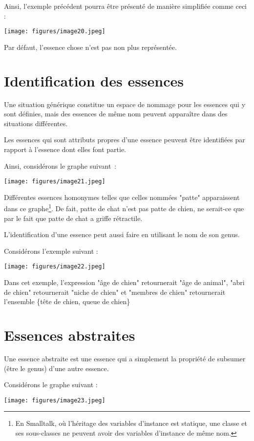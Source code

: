 \documentclass[a4paper, 12pt, openright, french]{book}
\begin{document}
Ainsi, l'exemple précédent pourra être présenté de
manière simplifiée comme ceci :

\texttt{[image: figures/image20.jpeg]}

Par défaut, l'essence chose n'est pas
non plus représentée.

\newpage
\raggedbottom
\section{Identification des essences}

Une situation générique constitue un espace de nommage pour les essences
qui y sont définies, mais des essences de même nom peuvent apparaître dans des situations
différentes.

Les essences qui sont attributs propres d'une essence
peuvent être identifiées par rapport à l'essence dont
elles font partie.

Ainsi, considérons le graphe suivant~:

\texttt{[image: figures/image21.jpeg]}

Différentes essences homonymes telles que celles nommées "patte"
apparaissent dans ce graphe\footnote{En Smalltalk, où l'héritage des variables d'instance est statique, une classe et ses sous-classes ne peuvent avoir des variables d'instance de même nom.}. De fait, patte de chat n'est pas patte de chien, ne serait-ce que par le fait que patte de chat a griffe rétractile.

L'identification d'une essence peut
aussi faire en utilisant le nom de son genus.

Considérons l'exemple suivant :

\texttt{[image: figures/image22.jpeg]}

Dans cet exemple, l'expression "âge de chien"
retournerait "âge de animal", "abri de chien" retournerait "niche de
chien" et "membres de chien" retournerait l'ensemble
\{tête de chien, queue de chien\}


\newpage
\section{Essences abstraites}

Une essence abstraite est une essence qui a simplement la propriété de
subsumer (être le genus) d'une autre essence.

Considérons le graphe suivant :

\texttt{[image: figures/image23.jpeg]}
\end{document}
